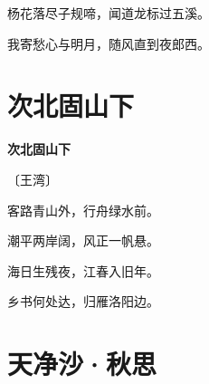 \documentclass[12pt,UTF-8,openany,fontset=none]{ctexbook}
\begin{document}
    \vspace{18pt}  %

\begin{center}
    \begin{Large}

        杨花落尽子规啼，闻道龙标过五溪。

        我寄愁心与明月，随风直到夜郎西。

    \end{Large}

\end{center}

\vspace{8pt}
\clearpage

\section{次北固山下}


\begin{center}
    {\bfseries 次北固山下}

    \vspace{18pt}

    \begin{large}\xuwen
        〔王湾〕
    \end{large}

\end{center}

    \vspace{18pt}  %

\begin{center}
    \begin{Large}

        客路青山外，行舟绿水前。

        潮平两岸阔，风正一帆悬。

        海日生残夜，江春入旧年。

        乡书何处达，归雁洛阳边。

    \end{Large}

\end{center}

\vspace{8pt}
\clearpage

\section{天净沙·秋思}

\end{document}
